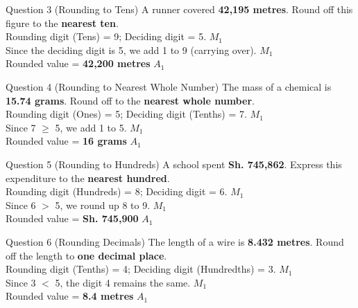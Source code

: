 \documentclass[12pt, a4paper, oneside]{article}
\begin{document}
\begin{solvingbox}{Question 3 (Rounding to Tens)}
A runner covered \textbf{42,195 metres}. Round off this figure to the \textbf{nearest ten}. \\
Rounding digit (Tens) = 9; Deciding digit = 5. \hfill $M_1$ \\
Since the deciding digit is 5, we add 1 to 9 (carrying over). \hfill $M_1$ \\
Rounded value = \textbf{42,200 metres} \hfill $A_1$
\end{solvingbox}

\begin{solvingbox}{Question 4 (Rounding to Nearest Whole Number)}
The mass of a chemical is \textbf{15.74 grams}. Round off to the \textbf{nearest whole number}. \\
Rounding digit (Ones) = 5; Deciding digit (Tenths) = 7. \hfill $M_1$ \\
Since 7 $\ge$ 5, we add 1 to 5. \hfill $M_1$ \\
Rounded value = \textbf{16 grams} \hfill $A_1$
\end{solvingbox}


\begin{solvingbox}{Question 5 (Rounding to Hundreds)}
A school spent \textbf{Sh. 745,862}. Express this expenditure to the \textbf{nearest hundred}. \\
Rounding digit (Hundreds) = 8; Deciding digit = 6. \hfill $M_1$ \\
Since 6 $>$ 5, we round up 8 to 9. \hfill $M_1$ \\
Rounded value = \textbf{Sh. 745,900} \hfill $A_1$
\end{solvingbox}

\begin{solvingbox}{Question 6 (Rounding Decimals)}
The length of a wire is \textbf{8.432 metres}. Round off the length to \textbf{one decimal place}. \\
Rounding digit (Tenths) = 4; Deciding digit (Hundredths) = 3. \hfill $M_1$ \\
Since 3 $<$ 5, the digit 4 remains the same. \hfill $M_1$ \\
Rounded value = \textbf{8.4 metres} \hfill $A_1$
\end{solvingbox}
\end{document}
